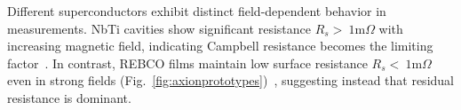     Different superconductors exhibit distinct field-dependent behavior in measurements. NbTi cavities show significant resistance $R_s>~1 \text{m}\Omega$ with increasing magnetic field, indicating Campbell resistance becomes the limiting factor~\cite{Braine:2024nzi}. In contrast, REBCO films maintain low surface resistance $R_s<~1 \text{m}\Omega$ even in strong fields (Fig.~\ref{fig:axionprototypes})~\cite{posenMeasurementHighQuality2022, ahnSuperconductingCavityHigh2020}, suggesting instead that residual resistance is dominant.
    
    
    
   
    


        


    
